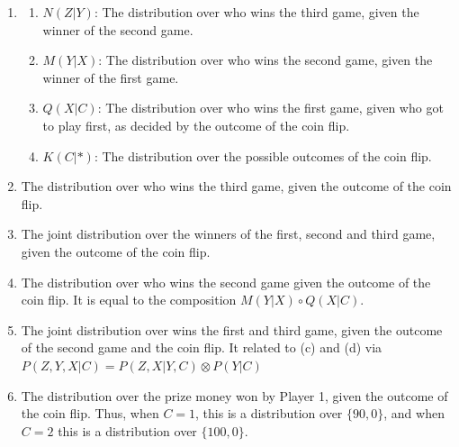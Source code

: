 \begin{enumerate}
  \begin{ungradedsolution}
    \begin{enumerate}
      \item
      \begin{enumerate}
        \item $N(Z|Y)$: The distribution over who wins the third game, given the winner of the second game.
        \item $M(Y|X)$: The distribution over who wins the second game, given the winner of the first game.
        \item $Q(X|C)$: The distribution over who wins the first game, given who got to play first, as decided by the outcome of the coin flip.
        \item $K(C|*)$: The distribution over the possible outcomes of the coin flip.
      \end{enumerate}
      \item The distribution over who wins the third game, given the outcome of the coin flip.
      \item The joint distribution over the winners of the first, second and third game, given the outcome of the coin flip.
      \item The distribution over who wins the second game given the outcome of the coin flip. It is equal to the composition $M(Y|X)\circ Q(X|C)$.
      \item The joint distribution over wins the first and third game, given the outcome of the second game and the coin flip. It related to (c) and (d) via $P(Z, Y, X|C) = P(Z, X|Y, C) \otimes P(Y|C)$
      \item The distribution over the prize money won by Player 1, given the outcome of the coin flip. Thus, when $C=1$, this is a distribution over $\{90,0\}$, and when $C=2$ this is a distribution over $\{100,0\}$.
    \end{enumerate}
  \end{ungradedsolution}


\end{enumerate}
